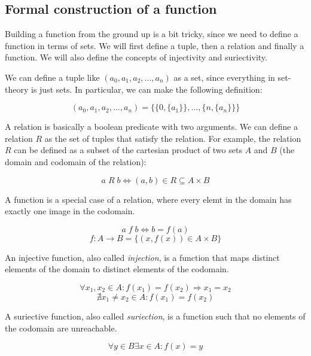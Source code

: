 \subsection{Formal construction of a function}
Building a function from the ground up is a bit tricky, since we need to define a function in terms of sets. We 
will first define a tuple, then a relation and finally a function. We will also define the concepts of injectivity and suriectivity.

\begin{definition}[Tuple]
    We can define a tuple like $(a_0, a_1, a_2, \ldots, a_n)$ as a set, since 
    everything in set-theory is just sets. In particular, we can make the 
    following definition:

    $$ (a_0, a_1, a_2, \ldots, a_n) = \{ \{0, \{a_1\}\}, ..., \{n, \{a_n\}\} \}$$
\end{definition}

\begin{definition}[Relation]
    A relation is basically a boolean predicate with two arguments. We can define a 
    relation $R$ as the set of tuples that satisfy the relation. For example, the 
    relation $R$ can be defined as a subset of the cartesian product of two sets $A$ 
    and $B$ (the domain and codomain of the relation):

    $$ a\;R\;b \iff (a,b) \in R \subseteq A \times B $$
\end{definition}

\begin{definition}[Function]
    A function is a special case of a relation, where every elemt in the domain 
    has exactly one image in the codomain.

    $$ a\;f\;b \iff b = f(a) $$
    $$ f : A \rightarrow B = \{ (x,f(x)) \in A \times B \} $$
\end{definition}

\begin{definition}[Injection]
    An injective function, also called \emph{injection}, is a function that 
    maps distinct elements of the domain to distinct elements of the codomain.

    $$ \forall x_1, x_2 \in A : f(x_1) = f(x_2) \Rightarrow x_1 = x_2 $$
    $$ \nexists x_1 \neq x_2 \in A : f(x_1) = f(x_2) $$
\end{definition}

\begin{definition}[Suriection]
    A suriective function, also called \emph{suriection}, is a function such that 
    no elements of the codomain are unreachable.
        
    $$ \forall y \in B \exists x \in A : f(x) = y $$
\end{definition}
    

